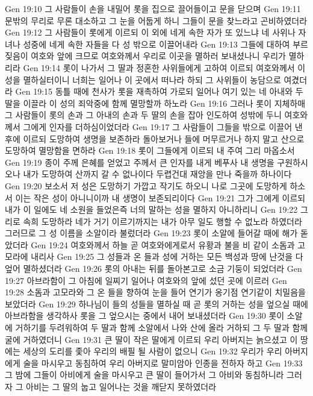Gen 19:10  그 사람들이 손을 내밀어 롯을 집으로 끌어들이고 문을 닫으며
Gen 19:11  문밖의 무리로 무론 대소하고 그 눈을 어둡게 하니 그들이 문을 찾느라고 곤비하였더라
Gen 19:12  그 사람들이 롯에게 이르되 이 외에 네게 속한 자가 또 있느냐 네 사위나 자녀나 성중에 네게 속한 자들을 다 성 밖으로 이끌어내라
Gen 19:13  그들에 대하여 부르짖음이 여호와 앞에 크므로 여호와께서 우리로 이곳을 멸하러 보내셨나니 우리가 멸하리라
Gen 19:14  롯이 나가서 그 딸과 정혼한 사위들에게 고하여 이르되 여호와께서 이 성을 멸하실터이니 너희는 일어나 이 곳에서 떠나라 하되 그 사위들이 농담으로 여겼더라
Gen 19:15  동틀 때에 천사가 롯을 재촉하여 가로되 일어나 여기 있는 네 아내와 두 딸을 이끌라 이 성의 죄악중에 함께 멸망할까 하노라
Gen 19:16  그러나 롯이 지체하매 그 사람들이 롯의 손과 그 아내의 손과 두 딸의 손을 잡아 인도하여 성밖에 두니 여호와께서 그에게 인자를 더하심이었더라
Gen 19:17  그 사람들이 그들을 밖으로 이끌어 낸 후에 이르되 도망하여 생명을 보존하라 돌아보거나 들에 머무르거나 하지 말고 산으로 도망하여 멸망함을 면하라
Gen 19:18  롯이 그들에게 이르되 내 주여 그리 마옵소서
Gen 19:19  종이 주께 은혜를 얻었고 주께서 큰 인자를 내게 베푸사 내 생명을 구원하시오나 내가 도망하여 산까지 갈 수 없나이다 두렵건대 재앙을 만나 죽을까 하나이다
Gen 19:20  보소서 저 성은 도망하기 가깝고 작기도 하오니 나로 그곳에 도망하게 하소서 이는 작은 성이 아니니이까 내 생명이 보존되리이다
Gen 19:21  그가 그에게 이르되 내가 이 일에도 네 소원을 들었은즉 너의 말하는 성을 멸하지 아니하리니
Gen 19:22  그리로 속희 도망하라 네가 거기 이르기까지는 내가 아무 일도 행할 수 없노라 하였더라 그러므로 그 성 이름을 소알이라 불렀더라
Gen 19:23  롯이 소알에 들어갈 때에 해가 돋았더라
Gen 19:24  여호와께서 하늘 곧 여호와에게로서 유황과 불을 비 같이 소돔과 고모라에 내리사
Gen 19:25  그 성들과 온 들과 성에 거하는 모든 백성과 땅에 난것을 다 엎어 멸하셨더라
Gen 19:26  롯의 아내는 뒤를 돌아본고로 소금 기둥이 되었더라
Gen 19:27  아브라함이 그 아침에 일찌기 일어나 여호와의 앞에 섰던 곳에 이르러
Gen 19:28  소돔과 고모라와 그 온 들을 향하여 눈을 들어 연기가 옹기점 연기같이 치밀음을 보았더라
Gen 19:29  하나님이 들의 성들을 멸하실 때 곧 롯의 거하는 성을 엎으실 때에 아브라함을 생각하사 롯을 그 엎으시는 중에서 내어 보내셨더라
Gen 19:30  롯이 소알에 거하기를 두려워하여 두 딸과 함께 소알에서 나와 산에 올라 거하되 그 두 딸과 함께 굴에 거하였더니
Gen 19:31  큰 딸이 작은 딸에게 이르되 우리 아버지는 늙으셨고 이 땅에는 세상의 도리를 좇아 우리의 배필 될 사람이 없으니
Gen 19:32  우리가 우리 아버지에게 술을 마시우고 동침하여 우리 아버지로 말미암아 인종을 전하자 하고
Gen 19:33  그 밤에 그들이 아비에게 술을 마시우고 큰 딸이 들어가서 그 아비와 동침하니라 그러자 그 아비는 그 딸의 눕고 일어나는 것을 깨닫지 못하였더라
